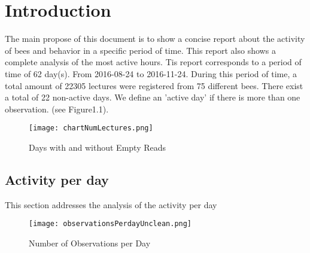 \documentclass[11pt,fleqn]{book} %
\begin{document}
\section*{Introduction}%
The main propose of this document  is to show a concise report about the activity of bees and behavior in a specific period of time. This report also shows a complete analysis of the most active hours.\newline%
\newline%
Tis report corresponds to a period of time of 62 day(s). From 2016{-}08{-}24 to 2016{-}11{-}24. During this period of time, a total amount of 22305 lectures were registered from 75 different bees. There exist a total of 22 non{-}active days. We define an 'active day' if there is more than one observation. (see Figure1.1).\newline%
\newline%
%


\begin{figure}[h!]%
\centering%
\texttt{[image: chartNumLectures.png]}%
\caption{Days with and without Empty Reads}%
\end{figure}

%
\subsection*{Activity per day}%
This section addresses the analysis of the activity per day%


\begin{figure}[h!]%
\centering%
\texttt{[image: observationsPerdayUnclean.png]}%
\caption{Number of Observations per Day}%
\end{figure}
\end{document}
